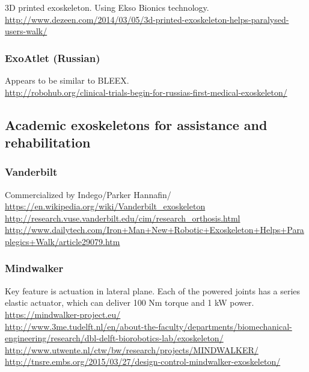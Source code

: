 \noindent
3D printed exoskeleton. Using Ekso Bionics technology.\\
\url{http://www.dezeen.com/2014/03/05/3d-printed-exoskeleton-helps-paralysed-users-walk/}\\


\subsubsection{ExoAtlet (Russian)}

\noindent
Appears to be similar to BLEEX.\\
\url{http://robohub.org/clinical-trials-begin-for-russias-first-medical-exoskeleton/}\\


\subsection{Academic exoskeletons for assistance and rehabilitation}

\subsubsection{Vanderbilt}

\noindent
Commercialized by Indego/Parker Hannafin/\\
\url{https://en.wikipedia.org/wiki/Vanderbilt_exoskeleton}\\
\url{http://research.vuse.vanderbilt.edu/cim/research_orthosis.html}\\
\url{http://www.dailytech.com/Iron+Man+New+Robotic+Exoskeleton+Helps+Paraplegics+Walk/article29079.htm}\\

\subsubsection{Mindwalker}

\noindent
Key feature is actuation in lateral plane.
Each of the powered joints has a series elastic
actuator, which can deliver 100 Nm torque and 1 kW power.\\
\url{https://mindwalker-project.eu/}\\
\url{http://www.3me.tudelft.nl/en/about-the-faculty/departments/biomechanical-engineering/research/dbl-delft-biorobotics-lab/exoskeleton/}\\
\url{http://www.utwente.nl/ctw/bw/research/projects/MINDWALKER/}\\
\url{http://tnsre.embs.org/2015/03/27/design-control-mindwalker-exoskeleton/}\\

